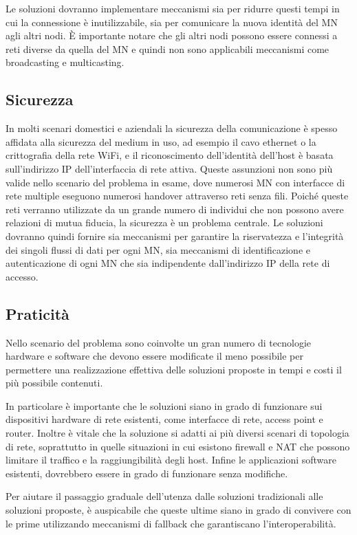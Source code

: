 \documentclass[12pt,a4paper,openright,twoside]{book}
\begin{document}
Le soluzioni dovranno implementare meccanismi sia per ridurre questi
tempi in cui la connessione è inutilizzabile, sia per comunicare la
nuova identità del MN agli altri nodi. È importante notare che gli
altri nodi possono essere connessi a reti diverse da quella del MN e
quindi non sono applicabili meccanismi come broadcasting e
multicasting.

\subsection{Sicurezza}
In molti scenari domestici e aziendali la sicurezza della
comunicazione è spesso affidata alla sicurezza del medium in uso, ad
esempio il cavo ethernet o la crittografia della rete WiFi, e il
riconoscimento dell'identità dell'host è basata sull'indirizzo IP
dell'interfaccia di rete attiva. Queste assunzioni non sono più valide
nello scenario del problema in esame, dove numerosi MN con interfacce
di rete multiple eseguono numerosi handover attraverso reti senza
fili. Poiché queste reti verranno utilizzate da un grande numero di
individui che non possono avere relazioni di mutua fiducia, la
sicurezza è un problema centrale. Le soluzioni dovranno quindi fornire
sia meccanismi per garantire la riservatezza e l'integrità dei singoli
flussi di dati per ogni MN, sia meccanismi di identificazione e
autenticazione di ogni MN che sia indipendente dall'indirizzo IP della
rete di accesso.

\subsection{Praticità}
Nello scenario del problema sono coinvolte un gran numero di
tecnologie hardware e software che devono essere modificate il meno
possibile per permettere una realizzazione effettiva delle soluzioni
proposte in tempi e costi il più possibile contenuti.

In particolare è importante che le soluzioni siano in grado di
funzionare sui dispositivi hardware di rete esistenti, come interfacce
di rete, access point e router. Inoltre è vitale che la soluzione si
adatti ai più diversi scenari di topologia di rete, soprattutto in
quelle situazioni in cui esistono firewall e NAT che possono limitare
il traffico e la raggiungibilità degli host. Infine le applicazioni
software esistenti, dovrebbero essere in grado di funzionare senza
modifiche.

Per aiutare il passaggio graduale dell'utenza dalle soluzioni
tradizionali alle soluzioni proposte, è auspicabile che queste ultime
siano in grado di convivere con le prime utilizzando meccanismi di
fallback che garantiscano l'interoperabilità.
\end{document}

